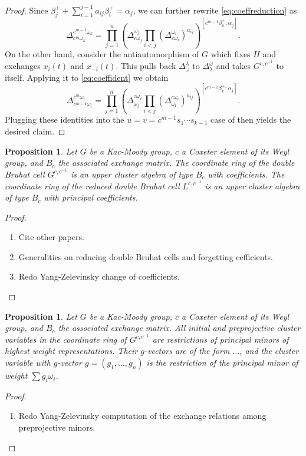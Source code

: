 \documentclass[11pt]{amsart}
\newtheorem{proposition}[theorem]{Proposition}
\begin{document}
\begin{proof}
Since $\beta_j^+ + \sum_{i=1}^{j-1} a_{ij} \beta_i^+ = \alpha_j$, we can further rewrite \cref{eq:coeffreduction} as
\begin{equation}\label{eq:coeffident}
\Delta_{c^m \omega_k}^{c^{m-1} \omega_k} = 
\prod_{j=1}^n \left( \Delta_{c \omega_j}^{\omega_j} \prod_{i < j}(\Delta_{c \omega_i}^{\omega_i})^{a_{ij}}\right)^{[c^{m-1} \beta_k^+:\alpha_j]}. 
\end{equation}
On the other hand, consider the antiautomorphism of $G$ which fixes $H$ and exchanges $x_i(t)$ and $x_{-i}(t)$.  This pulls back $\Delta_{\omega}^{\lambda}$ to $\Delta^{\omega}_{\lambda}$ and takes $G^{c,c^{-1}}$ to itself.  Applying it to \cref{eq:coeffident} we obtain
\[
\Delta^{c^m \omega_i}_{c^{m-1} \omega_i} = 
\prod_{j=1}^n \left( \Delta^{c \omega_j}_{\omega_j} \prod_{i < j}(\Delta^{c \omega_i}_{\omega_i})^{a_{ij}}\right)^{[c^{m-1} \beta_k^+:\alpha_j]}.
\]
Plugging these identities into the  $u = v = c^{m-1}s_1 \cdots s_{k-1}$ case of  then yields the desired claim.
\end{proof}

\begin{proposition}
Let $G$ be a Kac-Moody group, $c$ a Coxeter element of its Weyl group, and $B_c$ the associated exchange matrix.  The coordinate ring of the double Bruhat cell $G^{c,c^{-1}}$ is an upper cluster algebra of type $B_c$ with coefficients.  The coordinate ring of the reduced double Bruhat cell $L^{c,c^{-1}}$ is an upper cluster algebra of type $B_c$ with principal coefficients.
\end{proposition}
\begin{proof}
\begin{enumerate}
\item Cite other papers.
\item Generalities on reducing double Bruhat cells and forgetting cefficients.
\item Redo Yang-Zelevinsky change of coefficients.
\end{enumerate}
\end{proof}

\begin{proposition}
Let $G$ be a Kac-Moody group, $c$ a Coxeter element of its Weyl group, and $B_c$ the associated exchange matrix.  All initial and preprojective cluster variables in the coordinate ring of $G^{c,c^{-1}}$ are restrictions of principal minors of highest weight representations.  Their $g$-vectors are of the form $\dotsc$, and the cluster variable with $g$-vector $g = (g_1,\dotsc,g_n)$ is the restriction of the principal minor of weight $\sum g_i \omega_i$.
\end{proposition}
\begin{proof}
\begin{enumerate}
\item Redo Yang-Zelevinsky computation of the exchange relations among preprojective minors.
\end{enumerate}
\end{proof}
\end{document}
